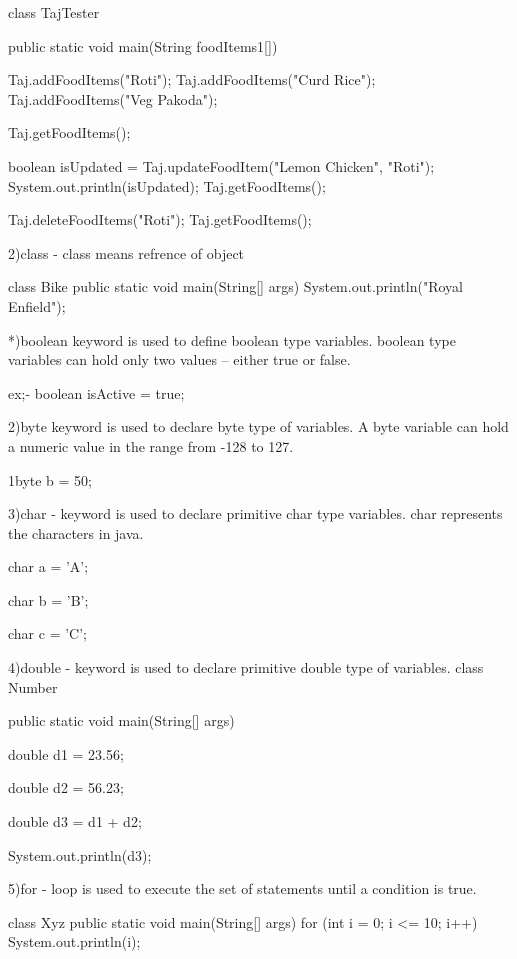     
  	class TajTester{
               public static void main(String foodItems1[]){
				 
                Taj.addFoodItems("Roti");
				Taj.addFoodItems("Curd Rice");
				Taj.addFoodItems("Veg Pakoda");
           

			 Taj.getFoodItems();
			 
			 
		boolean isUpdated = Taj.updateFoodItem("Lemon Chicken", "Roti");
		System.out.println(isUpdated);		 
		Taj.getFoodItems();
		
		
		Taj.deleteFoodItems("Roti");
		Taj.getFoodItems();
			
			   }		
				
}			
			


2)class	- class means refrence of object

   class Bike {
   public static void main(String[] args) {
    System.out.println("Royal Enfield");
  }
}

*)boolean keyword is used to define boolean type variables. boolean type variables can hold only two values – either true or false.

ex;- boolean isActive = true;

      2)byte keyword is used to declare byte type of variables. A byte variable can hold a numeric value in the range from -128 to 127.

      1byte b = 50;

3)char - keyword is used to declare primitive char type variables. char represents the characters in java.

        char a = 'A';
         
        char b = 'B';
         
        char c = 'C';

		
4)double - keyword is used to declare primitive double type of variables.
class Number
{
    public static void main(String[] args) 
    {
        double d1 = 23.56;
         
        double d2 = 56.23;
         
        double d3 = d1 + d2;
         
        System.out.println(d3);
    }
}



5)for - loop is used to execute the set of statements until a condition is true.

class Xyz
{
    public static void main(String[] args) 
    {
        for (int i = 0; i <= 10; i++)
        {
            System.out.println(i);
        }
    }
}

